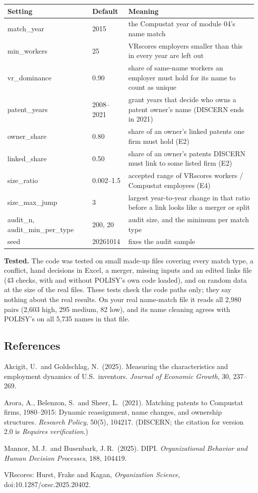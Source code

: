 \documentclass[11pt,a4paper]{article}
\newcommand{\RV}{\textcolor{rvtext}{\textit{Requires verification}}}
\begin{document}
\begin{longtable}{@{}L{3.3cm}L{2.1cm}L{9.6cm}@{}}
\toprule
\textbf{Setting} & \textbf{Default} & \textbf{Meaning}\\
\midrule\endhead
\bottomrule\endfoot
match\_year & 2015 & the Compustat year of module 04's name match\\
min\_workers & 25 & VRscores employers smaller than this in every year are left out\\
vr\_dominance & 0.90 & share of same-name workers an employer must hold for its name to count as unique\\
patent\_years & 2008--2021 & grant years that decide who owns a patent owner's name (DISCERN ends in 2021)\\
owner\_share & 0.80 & share of an owner's linked patents one firm must hold (E2)\\
linked\_share & 0.50 & share of an owner's patents DISCERN must link to some listed firm (E2)\\
size\_ratio & 0.002--1.5 & accepted range of VRscores workers / Compustat employees (E4)\\
size\_max\_jump & 3 & largest year-to-year change in that ratio before a link looks like a merger or split\\
audit\_n, audit\_min\_per\_type & 200, 20 & audit size, and the minimum per match type\\
seed & 20261014 & fixes the audit sample\\
\end{longtable}

\textbf{Tested.} The code was tested on small made-up files covering every match type, a conflict, hand decisions in Excel, a merger, missing inputs and an edited links file (43 checks, with and without POLISY's own code loaded), and on random data at the size of the real files. These tests check the code paths only; they say nothing about the real results. On your real name-match file it reads all 2,980 pairs (2,603 high, 295 medium, 82 low), and its name cleaning agrees with POLISY's on all 5,735 names in that file.

\subsection*{References}
{\small
Akcigit, U.\ and Goldschlag, N.\ (2025). Measuring the characteristics and employment dynamics of U.S.\ inventors. \emph{Journal of Economic Growth}, 30, 237--269.

Arora, A., Belenzon, S.\ and Sheer, L.\ (2021). Matching patents to Compustat firms, 1980--2015: Dynamic reassignment, name changes, and ownership structures. \emph{Research Policy}, 50(5), 104217. (DISCERN; the citation for version 2.0 is \RV.)

Mannor, M.\,J.\ and Busenbark, J.\,R.\ (2025). DIPI. \emph{Organizational Behavior and Human Decision Processes}, 188, 104419.

VRscores: Hurst, Frake and Kagan, \emph{Organization Science}, doi:10.1287/orsc.2025.20402.
\par}
\end{document}

